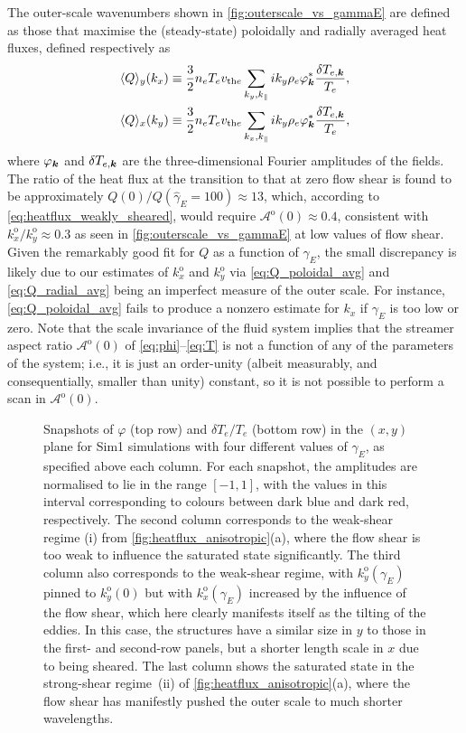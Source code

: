 \documentclass{jpp}
\newcommand{\phinorm}{\varphi}
\newcommand{\kxo}{k_x^\text{o}}
\newcommand{\kyo}{k_y^\text{o}}
\newcommand{\kyoO}{k_{y}^\text{o}(0)}
\newcommand{\gammaE}{\gamma_{E}}
\newcommand{\gammaEhat}{\hat{\gamma}_{E}}
\newcommand{\A}{\mathcal{A}}
\newcommand{\AoO}{\A^\text{o}(0)}
\begin{document}
The outer-scale wavenumbers shown in \cref{fig:outerscale_vs_gammaE} are defined as those that maximise the (steady-state) poloidally and radially averaged heat fluxes, defined respectively as
\begin{align}
	\langle Q\rangle_{y} (k_x) &\equiv \frac{3}{2} n_{e} T_{e} \vthe \sum_{k_y, \kpar} i k_y \rho_e{\phinorm}^*_\vk \frac{\delta{T}_{e, \vk}}{T_{e}}, \label{eq:Q_poloidal_avg} \\
	\langle Q\rangle_{x} (k_y) &\equiv \frac{3}{2} n_{e} T_{e} \vthe \sum_{k_x, \kpar} i k_y \rho_e{\phinorm}^*_\vk \frac{\delta{T}_{e, \vk}}{T_{e}} \label{eq:Q_radial_avg},
\end{align}
where \(\phinorm_\vk\) and \(\delta{T}_{e, {\boldsymbol{k}}}\) are the three-dimensional Fourier amplitudes of the fields. The ratio of the heat flux at the transition to that at zero flow shear is found to be approximately \mbox{\(Q(0)/Q(\gammaEhat=100)\approx13\)}, which, according to \cref{eq:heatflux_weakly_sheared}, would require \(\AoO \approx 0.4\), consistent with \mbox{\(\kxo/\kyo \approx 0.3\)} as seen in \cref{fig:outerscale_vs_gammaE} at low values of flow shear. Given the remarkably good fit for \(Q\) as a function of \(\gammaE\), the small discrepancy is likely due to our estimates of \(\kxo\) and \(\kyo\) via \cref{eq:Q_poloidal_avg} and \cref{eq:Q_radial_avg} being an imperfect measure of the outer scale. For instance, \cref{eq:Q_poloidal_avg} fails to produce a nonzero estimate for \(k_x\) if \(\gammaE\) is too low or zero. Note that the scale invariance of the fluid system implies that the streamer aspect ratio \(\AoO\) of \cref{eq:phi}--\cref{eq:T} is not a function of any of the parameters of the system; i.e., it is just an order-unity (albeit measurably, and consequentially, smaller than unity) constant, so it is not possible to perform a scan in \(\AoO\).

\begin{figure}
	\centering
	\caption{Snapshots of \(\varphi\) (top row) and \(\delta T_e/T_{e}\) (bottom row) in the \((x, y)\) plane for Sim1 simulations with four different values of \(\gammaE\), as specified above each column. For each snapshot, the amplitudes are normalised to lie in the range \([-1, 1]\), with the values in this interval corresponding to colours between dark blue and dark red, respectively. The second column corresponds to the weak-shear regime (i) from \cref{fig:heatflux_anisotropic}(a), where the flow shear is too weak to influence the saturated state significantly. The third column also corresponds to the weak-shear regime, with \(\kyo(\gammaE)\) pinned to \(\kyoO\) but with \(\kxo(\gammaE)\) increased by the influence of the flow shear, which here clearly manifests itself as the tilting of the eddies. In this case, the structures have a similar size in $y$ to those in the first- and second-row panels, but a shorter length scale in $x$ due to being sheared. The last column shows the saturated state in the strong-shear regime~(ii) of \cref{fig:heatflux_anisotropic}(a), where the flow shear has manifestly pushed the outer scale to much shorter wavelengths.}
	\label{fig:tripleplot}
\end{figure}
\end{document}
